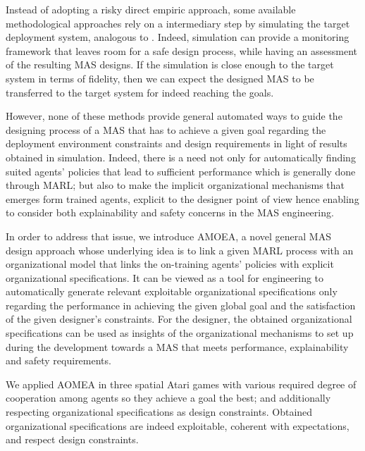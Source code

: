 \documentclass[runningheads]{llncs}
\begin{document}

Instead of adopting a risky direct empiric approach, some available methodological approaches rely on a intermediary step by simulating the target deployment system, analogous to . Indeed, simulation can provide a monitoring framework that leaves room for a safe design process, while having an assessment of the resulting MAS designs. If the simulation is close enough to the target system in terms of fidelity, then we can expect the designed MAS to be transferred to the target system for indeed reaching the goals.

However, none of these methods provide general automated ways to guide the designing process of a MAS that has to achieve a given goal regarding the deployment environment constraints and design requirements in light of results obtained in simulation. Indeed, there is a need not only for automatically finding suited agents' policies that lead to sufficient performance which is generally done through MARL; but also to make the implicit organizational mechanisms that emerges form trained agents, explicit to the designer point of view hence enabling to consider both explainability and safety concerns in the MAS engineering.


In order to address that issue, we introduce AMOEA, a novel general MAS design approach whose underlying idea is to link a given MARL process with an organizational model that links the on-training agents' policies with explicit organizational specifications. It can be viewed as a tool for engineering to automatically generate relevant exploitable organizational specifications only regarding the performance in achieving the given global goal and the satisfaction of the given designer's constraints. For the designer, the obtained organizational specifications can be used as insights of the organizational mechanisms to set up during the development towards a MAS that meets performance, explainability and safety requirements.


We applied AOMEA in three spatial Atari games with various required degree of cooperation among agents so they achieve a goal the best; and additionally respecting organizational specifications as design constraints. Obtained organizational specifications are indeed exploitable, coherent with expectations, and respect design constraints.
\end{document}
